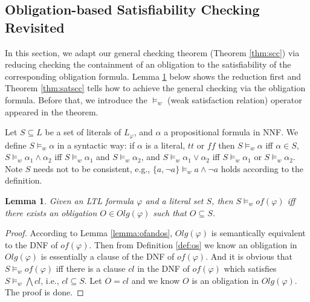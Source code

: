\documentclass[conference]{IEEEtran}
\newtheorem{lemma}{Lemma}
\newtheorem{proof}{IEEEproof}
\def\olg#1{\mathit{Olg}(#1)}
\def\phi{\varphi}
\def\ff{\mathit{ff}}
\def\tt{\mathit{tt}}
\def\of#1{\mathit{of}(#1)}
\begin{document}
\iffalse
The correctness of the lemma is directly guaranteed by the definitions of \textit{obligation formula} (Definition \ref{def:of}) and \textit{obligation set} (Definition \ref{def:os}).
\fi



\subsection{Obligation-based Satisfiability Checking Revisited}


In this section, we adapt our general checking theorem (Theorem
\ref{thm:scc}) via reducing checking the containment of an obligation
to the satisfiability of the corresponding obligation formula. Lemma
\ref{lem:reduction_2} below shows the reduction first and Theorem
\ref{thm:satscc} tells how to achieve the general checking via the
obligation formula. Before that, we introduce the $\models_w$ (weak satisfaction relation) 
operator appeared in the theorem.

Let $S \subseteq L$ be a set of literals of $L_\phi$, and $\alpha$ a
propositional formula in NNF. We define $S\models_w \alpha$ in
a syntactic way: if $\alpha$ is a literal, $\tt$ or $\ff$ then $S\models_w \alpha$
iff $\alpha\in S$, $S\models_w \alpha_1\wedge\alpha_2$ iff
$S\models_w\alpha_1$ and $S\models_w\alpha_2$, and
$S\models_w \alpha_1\vee\alpha_2$ iff $S\models_w\alpha_1$ or
$S\models_w\alpha_2$. Note $S$ needs not to be
consistent, e.g., $\{a,\neg a\}\models_w a\wedge \neg a$ holds according to the definition.


\begin{lemma}\label{lem:reduction_2}
  Given an LTL formula $\phi$ and a literal set $S$, then $S\models_w \of{\phi}$ iff there exists 
  an obligation $O\in\olg{\phi}$ such that $O\subseteq S$.
\end{lemma}
\begin{proof}
   According to Lemma \ref{lemma:ofandos}, $\olg{\phi}$ is semantically equivalent to the DNF of $\of{\phi}$. 
   Then from Definition \ref{def:os} we know an obligation in $\olg{\phi}$ is essentially a clause of the DNF of $\of{\phi}$. 
   And it is obvious that $S\models_w \of{\phi}$ iff there is a clause $cl$ in the DNF of $\of{\phi}$ which 
   satisfies $S\models_w \bigwedge cl$, i.e., $cl\subseteq S$. Let $O=cl$
   and we know $O$ is an obligation in $\olg{\phi}$. The proof is done.
   
\end{proof}
\end{document}

